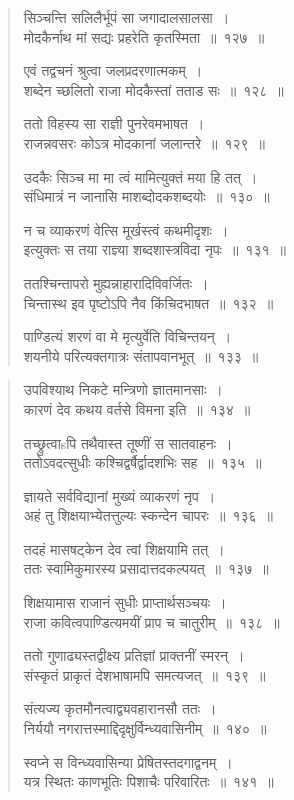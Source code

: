 \documentclass[11pt, openany]{book}
\begin{document}
\begin{multicols}{2}
\begin{quote}
{सिञ्चन्ति सलिलैर्भूपं सा जगादालसालसा~।\\
मोदकैर्नाथ मां सद्यः प्रहरेति कृतस्मिता~॥~१२७~॥

एवं तद्वचनं श्रुत्वा जलप्रदरणात्मकम्~।\\
शब्देन च्छलितो राजा मोदकैस्तां तताड सः~॥~१२८~॥

ततो विहस्य सा राज्ञी पुनरेवमभाषत~।\\
राजन्नवसरः कोऽत्र मोदकानां जलान्तरे~॥~१२९~॥

उदकैः सिञ्च मा मा त्वं मामित्युक्तं मया हि तत्~।\\
संधिमात्रं न जानासि माशब्दोदकशब्दयोः~॥~१३०~॥

न च व्याकरणं वेत्सि मूर्खस्त्वं कथमीदृशः~।\\
इत्युक्तः स तया राज्ञ्या शब्दशास्त्रविदा नृपः~॥~१३१~॥

ततश्चिन्तापरो मुह्यन्नाहारादिविवर्जितः~।\\
चिन्तास्थ इव पृष्टोऽपि नैव किंचिदभाषत~॥~१३२~॥

पाण्डित्यं शरणं वा मे मृत्युर्वेति विचिन्तयन्~।\\
शयनीये परित्यक्तगात्रः संतापवानभूत्~॥~१३३~॥}
\end{quote}

\columnbreak

\begin{quote}
{\mbh उपविश्याथ निकटे मन्त्रिणो ज्ञातमानसाः~।\\
कारणं देव कथय वर्तसे विमना इति~॥~१३४~॥

तच्छ्रुत्वाsपि तथैवास्त तूष्णीं स सातवाहनः~।\\
ततोऽवदत्सुधीः कश्चिद्वर्षैर्द्वादशभिः सह~॥~१३५~॥

ज्ञायते सर्वविद्यानां मुख्यं व्याकरणं नृप~।\\
अहं तु शिक्षयाभ्येतत्तुल्यः स्कन्देन चापरः~॥~१३६~॥

तदहं मासषट्केन देव त्वां शिक्षयामि तत्~।\\
ततः स्वामिकुमारस्य प्रसादात्तदकल्पयत्~॥~१३७~॥

शिक्षयामास राजानं सुधीः प्राप्तार्थसञ्चयः~।\\
राजा कवित्वपाण्डित्यमयीं प्राप च चातुरीम्~॥~१३८~॥

ततो गुणाढ्यस्तद्वीक्ष्य प्रतिज्ञां प्राक्तनीं स्मरन्~।\\
संस्कृतं प्राकृतं देशभाषामपि समत्यजत्~॥~१३९~॥

संत्यज्य कृतमौनत्वाद्व्यवहारानसौ ततः~।\\
निर्ययौ नगरात्तस्माद्दिदृक्षुर्विन्ध्यवासिनीम्~॥~१४०~॥

स्वप्ने स विन्ध्यवासिन्या प्रेषितस्तदगाद्वनम्~।\\
यत्र स्थितः काणभूतिः पिशाचैः परिवारितः~॥~१४१~॥

}
\end{quote}
\end{multicols}
\end{document}
